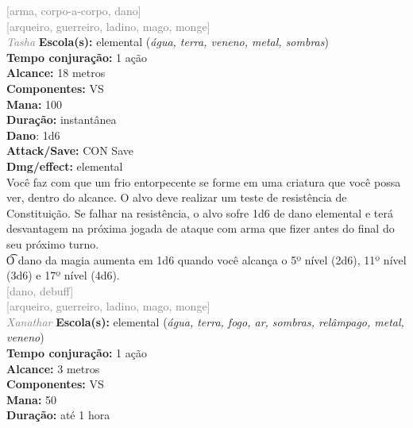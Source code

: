 \documentclass{RPG_Adventure}[2021/10/20]
\begin{document}
{\scriptsize \textcolor{gray}{[arma, corpo-a-corpo, dano]\\}}
{\scriptsize \textcolor{gray}{[arqueiro, guerreiro, ladino, mago, monge]\\}}
{\tiny \textcolor{gray}{\textit{Tasha}}}\jump{}
{\small \t \textbf{Escola(s):} elemental (\textit{água, terra, veneno, metal, sombras})\\\t \textbf{Tempo conjuração:} 1 ação\\\t \textbf{Alcance:} 18 metros\\\t \textbf{Componentes:} VS\\\t \textbf{Mana:} 100\\\t \textbf{Duração:} instantânea\\\t \textbf{Dano}: 1d6\\\t \textbf{Attack/Save:} CON Save\\\t \textbf{Dmg/effect:} elemental\\}
{\normalsize Você faz com que um frio entorpecente se forme em uma criatura que você possa ver, dentro do alcance. O alvo deve realizar um teste de resistência de Constituição. Se falhar na resistência, o alvo sofre 1d6 de dano elemental e terá desvantagem na próxima jogada de ataque com arma que fizer antes do final do seu próximo turno.\\\t O dano da magia aumenta em 1d6 quando você alcança o 5º nível (2d6), 11º nível (3d6) e 17º nível (4d6).\\}
{\scriptsize \textcolor{gray}{[dano, debuff]\\}}
{\scriptsize \textcolor{gray}{[arqueiro, guerreiro, ladino, mago, monge]\\}}
{\tiny \textcolor{gray}{\textit{Xanathar}}}\jump{}
{\small \t \textbf{Escola(s):} elemental (\textit{água, terra, fogo, ar, sombras, relâmpago, metal, veneno})\\\t \textbf{Tempo conjuração:} 1 ação\\\t \textbf{Alcance:} 3 metros\\\t \textbf{Componentes:} VS\\\t \textbf{Mana:} 50\\\t \textbf{Duração:} até 1 hora\\}
\end{document}
